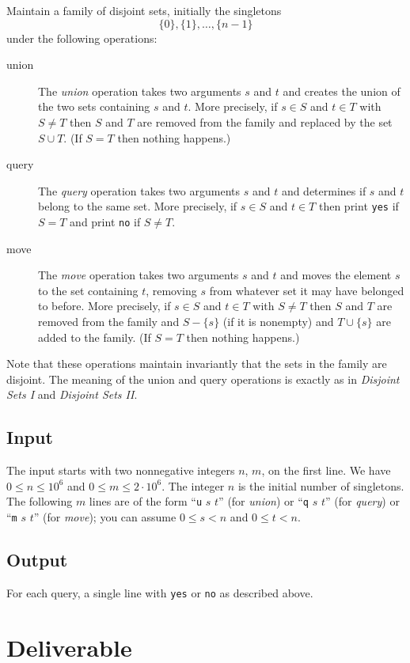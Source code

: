 \documentclass{tufte-handout}
\begin{document}
Maintain a family of disjoint sets, initially the singletons
\[ \{0\},\{1\}, \ldots,\{n-1\} \]
under the following operations:
\begin{description}
  \item[union]
The \emph{union} operation takes two arguments $s$ and $t$ and creates the union of the two sets containing $s$ and $t$.
More precisely, if $s\in S$ and $t\in T$ with $S\neq T$ then $S$ and $T$ are removed from the family and replaced by the set $S\cup T$. 
    (If $S=T$  then nothing happens.)
  \item[query]
    The \emph{query} operation takes two arguments $s$ and $t$ and determines if $s$ and $t$ belong to the same set.
    More precisely, if $s\in S$ and $t\in T$ then print \texttt{yes} if $S=T$ and print \texttt{no} if $S\neq T$.
  \item[move]
    The \emph{move} operation takes two arguments $s$ and $t$ and moves the element $s$ to the set containing $t$, removing $s$ from whatever set it may have belonged to before.
    More precisely, if $s\in S$ and $t\in T$ with $S\neq T$ then $S$ and $T$ are removed from the family and $S-\{s\}$ (if it is nonempty)  and $T\cup\{s\}$ are added to the family.
    (If $S= T$ then nothing happens.)
\end{description}
Note that these operations maintain invariantly that the sets in the family are disjoint.
The meaning of the union and query operations is exactly as in \emph{Disjoint Sets I} and \emph{Disjoint Sets II}.

\subsection{Input}

The input starts with two nonnegative integers $n$, $m$, on the first line.
We have $0\leq n\leq 10^6$ and $0\leq m\leq 2\cdot 10^6$.
The integer $n$ is the initial number of singletons.
The following $m$ lines are of the form ``\texttt{u} $s$ $t$'' (for \emph{union}) or ``\texttt{q} $s$ $t$'' (for \emph{query}) or ``\texttt{m} $s$ $t$'' (for \emph{move}); you can assume $0\leq s< n$ and $0\leq t< n$.

\subsection{Output}

For each query, a single line with \texttt{yes} or \texttt{no} as described above.

\section{Deliverable}
\end{document}
